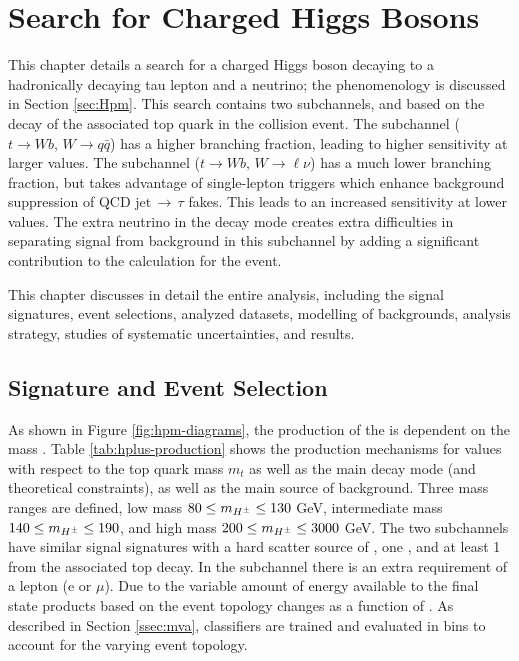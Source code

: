 \chapter{Search for Charged Higgs Bosons}\label{chap:hpana}
	This chapter details a search for a charged Higgs boson decaying to a hadronically decaying tau lepton and a neutrino; the phenomenology is discussed in Section \ref{sec:Hpm}. This search contains two subchannels, \taujets and \taulep based on the decay of the  associated top quark in the collision event. The \taujets subchannel ($t\rightarrow Wb, \, W \rightarrow q\bar{q}$)  has a higher branching fraction, leading to higher sensitivity at larger \mHpm values. The \taulep subchannel ($t\rightarrow Wb, \, W \rightarrow \ell \nu$)  has a much lower branching fraction, but takes advantage of single-lepton triggers which enhance background suppression of QCD $\mathrm{jet} \, \rightarrow \, \tau$ fakes. This leads to an increased sensitivity at lower \mHpm values. The extra neutrino in the \taulep decay mode creates extra difficulties in separating signal from background in this subchannel by adding a significant contribution to the \Etm calculation for the event. 

	This chapter discusses in detail the entire analysis, including the signal signatures, event selections, analyzed datasets, modelling of backgrounds, analysis strategy, studies of systematic uncertainties, and results.

	\section{Signature and Event Selection}\label{sec:signal}
		As shown in Figure \ref{fig:hpm-diagrams}, the production of the \Hpm is dependent on the mass \mHpm. Table \ref{tab:hplus-production} shows the production mechanisms for \mHpm values with respect to the top quark mass $m_t$ as well as the main decay mode (and theoretical constraints), as well as the main source of background. Three mass ranges are defined, low mass $80 \leq m_{H^{\pm}} \leq 130 $ GeV, intermediate mass $140 \leq m_{H^{\pm}} \leq 190$, and high mass $200 \leq m_{H^{\pm}} \leq 3000$ GeV.  The two subchannels have similar signal signatures with a hard scatter source of \Etm, one \tauhad, and at least 1 \bjet from the associated top decay. In the \taulep subchannel there is an extra requirement of a lepton (e or $\mu$). Due to the variable amount of energy available to the final state products based on \mHpm the event topology changes as a function of \mHpm. As described in Section \ref{ssec:mva}, classifiers are trained and evaluated in \mHpm bins to account for the varying event topology.

